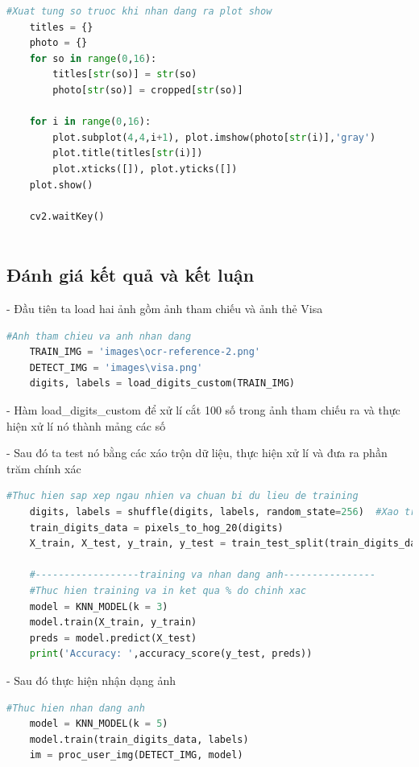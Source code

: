 \begin{lstlisting}[language=Python, caption=Recognition Visa]
    #Xuat tung so truoc khi nhan dang ra plot show
    titles = {}
    photo = {}
    for so in range(0,16):		
        titles[str(so)] = str(so)
        photo[str(so)] = cropped[str(so)]
    
    for i in range(0,16):
        plot.subplot(4,4,i+1), plot.imshow(photo[str(i)],'gray')
        plot.title(titles[str(i)])
        plot.xticks([]), plot.yticks([])
    plot.show()
        
    cv2.waitKey()           
    
\end{lstlisting}

\subsection{Đánh giá kết quả và kết luận}

- Đầu tiên ta load hai ảnh gồm ảnh tham chiếu và ảnh thẻ Visa
\begin{lstlisting}[language=Python]
    #Anh tham chieu va anh nhan dang
    TRAIN_IMG = 'images\ocr-reference-2.png'
    DETECT_IMG = 'images\visa.png'
    digits, labels = load_digits_custom(TRAIN_IMG)
\end{lstlisting}

- Hàm load\_digits\_custom để xử lí cắt 100 số trong ảnh tham chiếu ra và thực hiện xử lí nó thành mảng các số

- Sau đó ta test nó bằng các xáo trộn dữ liệu, thực hiện xử lí và đưa ra phần trăm chính xác

\begin{lstlisting}[language=Python]
    #Thuc hien sap xep ngau nhien va chuan bi du lieu de training
    digits, labels = shuffle(digits, labels, random_state=256)  #Xao tron du lieu
    train_digits_data = pixels_to_hog_20(digits)
    X_train, X_test, y_train, y_test = train_test_split(train_digits_data, labels, test_size=0.7)

    #------------------training va nhan dang anh----------------
    #Thuc hien training va in ket qua % do chinh xac
    model = KNN_MODEL(k = 3)
    model.train(X_train, y_train)
    preds = model.predict(X_test)
    print('Accuracy: ',accuracy_score(y_test, preds))
\end{lstlisting}

- Sau đó thực hiện nhận dạng ảnh
\begin{lstlisting}[language=Python]
    #Thuc hien nhan dang anh 
    model = KNN_MODEL(k = 5)
    model.train(train_digits_data, labels)
    im = proc_user_img(DETECT_IMG, model)
\end{lstlisting}

